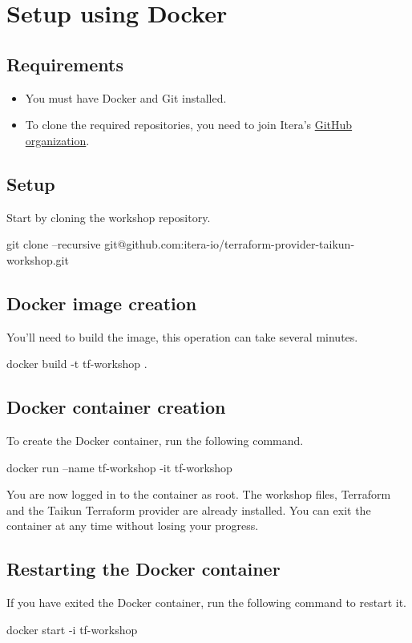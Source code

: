 \section{Setup using Docker}\label{sec:docker}

\subsection{Requirements}
\begin{itemize}
  \item You must have Docker and Git installed.
  \item To clone the required repositories, you need to join Itera's \href{https://github.com/itera-io}{GitHub organization}.
\end{itemize}

\subsection{Setup}
Start by cloning the workshop repository.
\begin{shell}
git clone --recursive git@github.com:itera-io/terraform-provider-taikun-workshop.git
\end{shell}

\subsection{Docker image creation}
You'll need to build the image, this operation can take several minutes.
\begin{shell}
docker build -t tf-workshop .
\end{shell}

\subsection{Docker container creation}
To create the Docker container, run the following command.
\begin{shell}
docker run --name tf-workshop -it tf-workshop
\end{shell}
You are now logged in to the container as root. The workshop files,
Terraform and the Taikun Terraform provider are already installed.
You can exit the container at any time without losing your progress.

\subsection{Restarting the Docker container}
If you have exited the Docker container, run the following command to restart it.
\begin{shell}
docker start -i tf-workshop
\end{shell}


